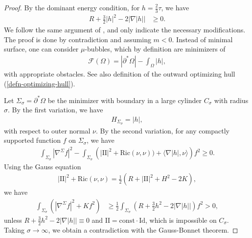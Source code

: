 \documentclass[11pt, letterpaper]{amsart}
\theoremstyle{definition}
\theoremstyle{remark}
\begin{document}
\begin{proof}
	By the dominant energy condition, for $h= \frac{2}{3} \tau $, we have
		\begin{align*}
		R + \frac{3}{2}|h|^2 - 2|\nabla |h| | &\geq 0.
	\end{align*} 
	We follow the same argument of \cite[Theorem 4.2]{Schoen87}, and only indicate the necessary modifications. The proof is done by contradiction and assuming $m<0$. 	
	Instead of minimal surface, one can consider $\mu $-bubbles, which by definition are minimizers of 
		\begin{align*}
		\mathcal{F}(\Omega ) = |\partial ^* \Omega | - \int_{\Omega } |h| ,
	\end{align*} 
	with appropriate obstacles. See also definition of the outward optimizing hull (\ref{defn-optimizing-hull}).

Let $\Sigma _{\sigma } = \partial ^* \Omega $ be the minimizer with boundary in a large cylinder $C_{\sigma }$ with radius $\sigma $. By the first variation, we have 
\begin{align*}
	H_{\Sigma _{\sigma }} = |h| ,
\end{align*} 
with respect to outer normal $\nu $. By the second variation,  for any compactly supported function $f$ on $\Sigma _{\sigma }$, we have
\begin{align*}
	\int_{\Sigma _{\sigma }} |\nabla ^{\Sigma } f|^2 - \int_{\Sigma _{\sigma }}\left( |\mathrm{II}|^2 + \mathrm{Ric}(\nu ,\nu ) ) + \langle \nabla |h| , \nu  \rangle \right) f^2  \geq 0.
\end{align*} 
Using the Gauss equation
\begin{align*}
	|\mathrm{II}|^2 + \mathrm{Ric}(\nu ,\nu ) = \frac{1}{2}\left( R +|\mathrm{II}|^2+  H^2 - 2 K \right) ,
\end{align*} 
we have
\begin{align*}
	\int_{\Sigma _{\sigma }} \left( |\nabla ^{\Sigma }f|^2 + K f^2\right) &\geq \frac{1}{2} \int_{\Sigma _{\sigma }} \left( R + \frac{3}{2} h^2 - 2|\nabla |h| | \right)  f^2 >0,
\end{align*} 
unless $R+ \frac{3}{2} h^2 - 2|\nabla |h| | \equiv 0$ and $\mathrm{II} = \mathrm{const}\cdot  \mathrm{Id}$, which is impossible on $C_{\sigma }$. Taking $\sigma \to \infty$, we obtain a contradiction with the Gauss-Bonnet theorem.

\end{proof}
\end{document}
